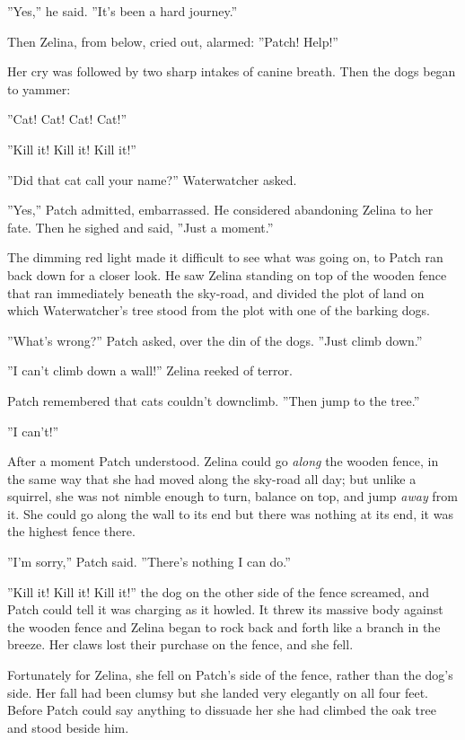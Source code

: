 \documentclass[11pt]{article}
\begin{document}
''Yes,'' he said. ''It's been a hard journey.''\par
Then Zelina, from below, cried out, alarmed: ''Patch! Help!''\par
Her cry was followed by two sharp intakes of canine breath. Then the dogs began to yammer:\par
''Cat! Cat! Cat! Cat!''\par
''Kill it! Kill it! Kill it!''\par
''Did that cat call your name?'' Waterwatcher asked.\par
''Yes,'' Patch admitted, embarrassed. He considered abandoning Zelina to her fate. Then he sighed and said, ''Just a moment.''\par
The dimming red light made it difficult to see what was going on, to Patch ran back down for a closer look. He saw Zelina standing on top of the wooden fence that ran immediately beneath the sky-road, and divided the plot of land on which Waterwatcher's tree stood from the plot with one of the barking dogs.\par
''What's wrong?'' Patch asked, over the din of the dogs. ''Just climb down.''\par
''I can't climb down a wall!'' Zelina reeked of terror.\par
Patch remembered that cats couldn't downclimb. ''Then jump to the tree.''\par
''I can't!''\par
After a moment Patch understood. Zelina could go {\it along} the wooden fence, in the same way that she had moved along the sky-road all day; but unlike a squirrel, she was not nimble enough to turn, balance on top, and jump {\it away} from it. She could go along the wall to its end %
 but there was nothing at its end, it was the highest fence there.\par
''I'm sorry,'' Patch said. ''There's nothing I can do.''\par
''Kill it! Kill it! Kill it!'' the dog on the other side of the fence screamed, and Patch could tell it was charging as it howled. It threw its massive body against the wooden fence and Zelina began to rock back and forth like a branch in the breeze. Her claws lost their purchase on the fence, and she fell.\par
Fortunately for Zelina, she fell on Patch's side of the fence, rather than the dog's side. Her fall had been clumsy but she landed very elegantly on all four feet. Before Patch could say anything to dissuade her she had climbed the oak tree and stood beside him.\par
\end{document}
